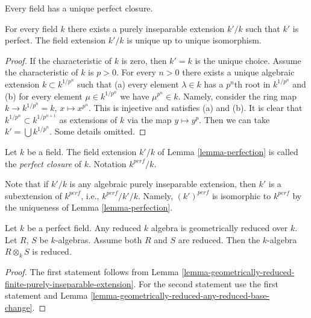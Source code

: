 \begin{lemma}
\label{lemma-perfection}
\begin{slogan}
Every field has a unique perfect closure.
\end{slogan}
For every field $k$ there exists a purely inseparable extension
$k'/k$ such that $k'$ is perfect. The field extension
$k'/k$ is unique up to unique isomorphism.
\end{lemma}

\begin{proof}
If the characteristic of $k$ is zero, then $k' = k$ is the
unique choice. Assume the characteristic of $k$ is $p > 0$.
For every $n > 0$ there exists a unique algebraic extension
$k \subset k^{1/p^n}$ such that (a) every element $\lambda \in k$
has a $p^n$th root in $k^{1/p^n}$ and (b) for every element
$\mu \in k^{1/p^n}$ we have $\mu^{p^n} \in k$.
Namely, consider the ring map $k \to k^{1/p^n} = k$, $x \mapsto x^{p^n}$.
This is injective and satisfies (a) and (b). It is clear that
$k^{1/p^n} \subset k^{1/p^{n + 1}}$ as extensions of $k$ via
the map $y \mapsto y^p$. Then we can take $k' = \bigcup k^{1/p^n}$.
Some details omitted.
\end{proof}

\begin{definition}
\label{definition-perfection}
Let $k$ be a field. The field extension $k'/k$ of Lemma \ref{lemma-perfection}
is called the {\it perfect closure} of $k$. Notation $k^{perf}/k$.
\end{definition}

\noindent
Note that if $k'/k$ is any algebraic purely inseparable extension, then
$k'$ is a subextension of $k^{perf}$, i.e., $k^{perf}/k'/k$. Namely,
$(k')^{perf}$ is isomorphic to $k^{perf}$ by the uniqueness of
Lemma \ref{lemma-perfection}.

\begin{lemma}
\label{lemma-perfect-reduced}
Let $k$ be a perfect field.
Any reduced $k$ algebra is geometrically reduced over $k$.
Let $R$, $S$ be $k$-algebras.
Assume both $R$ and $S$ are reduced.
Then the $k$-algebra $R \otimes_k S$ is reduced.
\end{lemma}

\begin{proof}
The first statement follows from
Lemma \ref{lemma-geometrically-reduced-finite-purely-inseparable-extension}.
For the second statement use the first statement and
Lemma \ref{lemma-geometrically-reduced-any-reduced-base-change}.
\end{proof}









